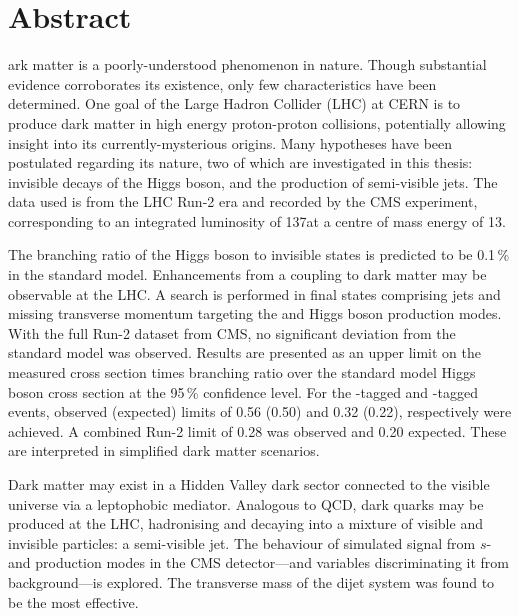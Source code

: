 %
%
%

\chapter*{Abstract}
\begin{SingleSpace}
ark matter is a poorly-understood phenomenon in nature. Though substantial evidence corroborates its existence, only few characteristics have been determined. One goal of the Large Hadron Collider (LHC) at CERN is to produce dark matter in high energy proton-proton collisions, potentially allowing insight into its currently-mysterious origins. Many hypotheses have been postulated regarding its nature, two of which are investigated in this thesis: invisible decays of the Higgs boson, and the production of semi-visible jets. The data used is from the LHC Run-2 era and recorded by the CMS experiment, corresponding to an integrated luminosity of 137\fbinv at a centre of mass energy of 13\TeV.

The branching ratio of the Higgs boson to invisible states is predicted to be 0.1\,\% in the standard model. Enhancements from a coupling to dark matter may be observable at the LHC. A search is performed in final states comprising jets and missing transverse momentum targeting the \ttH and \VH Higgs boson production modes. With the full Run-2 dataset from CMS, no significant deviation from the standard model was observed. Results are presented as an upper limit on the measured cross section times branching ratio over the standard model Higgs boson cross section at the 95\,\% confidence level. For the \ttH-tagged and \VH-tagged events, observed (expected) limits of 0.56 (0.50) and 0.32 (0.22), respectively were achieved. A combined Run-2 limit of 0.28 was observed and 0.20 expected. These are interpreted in simplified dark matter scenarios.

Dark matter may exist in a Hidden Valley dark sector connected to the visible universe via a leptophobic mediator. Analogous to QCD, dark quarks may be produced at the LHC, hadronising and decaying into a mixture of visible and invisible particles: a semi-visible jet. The behaviour of simulated signal from $s$- and \tchannel production modes in the CMS detector---and variables discriminating it from background---is explored. The transverse mass of the dijet system was found to be the most effective.
\end{SingleSpace}
\clearpage
